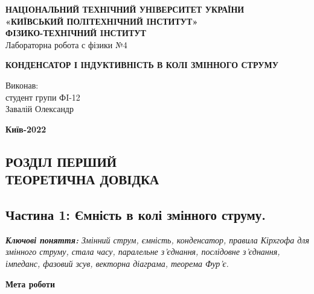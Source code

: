 \documentclass[a4paper,12pt]{article}
\begin{document}
    \begin{center}
		\hfill \break
		\large{\textbf{НАЦIОНАЛЬНИЙ ТЕХНIЧНИЙ УНIВЕРСИТЕТ УКРАЇНИ\\
				«КИЇВСЬКИЙ ПОЛIТЕХНIЧНИЙ IНСТИТУТ»\\
				ФIЗИКО-ТЕХНIЧНИЙ IНСТИТУТ}}\\
		\hfill \break \hfill \break \hfill\break \hfill \break \hfill \break \hfill \break \hfill \break
		\hfill \break \hfill \break
		\large{Лабораторна робота с фізики №4}
		\begin{center}
			\normalsize{\textbf{КОНДЕНСАТОР І ІНДУКТИВНІСТЬ В КОЛІ ЗМІННОГО СТРУМУ}}
		\end{center}
	\end{center}
	\hfill \break \hfill \break \hfill \break \hfill \break \hfill \break \hfill \break \hfill \break
	\hfill \break \hfill \break \hfill \break \hfill \break \hfill \break \hfill \break 
	\begin{flushright}
		\large{ \hspace{35pt} Виконав:\\
			студент групи ФI-12\\
			Завалій Олександр} 
	\end{flushright}
	\hfill \break \hfill \break \hfill \break \hfill \break \hfill \break \hfill \break \hfill \break
	\hfill \break \hfill \break 
	\begin{center} \textbf{Київ-2022} \end{center}
	\thispagestyle{empty}
	
	
	
\newpage
	\begin{center}
		\section* {РОЗДІЛ ПЕРШИЙ\\ТЕОРЕТИЧНА ДОВІДКА }
	\end{center}
    \subsection*{Частина 1: Ємність в колі змінного струму.}
	\textit{\textbf{Ключові поняття:} Змінний струм, ємність, конденсатор, правила Кірхгофа для змінного струму, 
    стала часу, паралельне з’єднання, послідовне з'єднання, імпеданс, фазовий зсув, векторна діаграма, теорема Фур’є.}
	\begin{center}
		\textbf{Мета роботи}
	\end{center}
\end{document}
